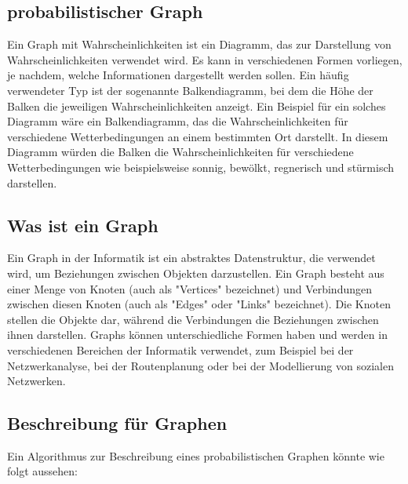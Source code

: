 \subsection{probabilistischer Graph}
Ein Graph mit Wahrscheinlichkeiten ist ein Diagramm, das zur Darstellung von Wahrscheinlichkeiten verwendet wird. Es kann in verschiedenen Formen vorliegen, je nachdem, welche Informationen dargestellt werden sollen. Ein häufig verwendeter Typ ist der sogenannte Balkendiagramm, bei dem die Höhe der Balken die jeweiligen Wahrscheinlichkeiten anzeigt. Ein Beispiel für ein solches Diagramm wäre ein Balkendiagramm, das die Wahrscheinlichkeiten für verschiedene Wetterbedingungen an einem bestimmten Ort darstellt. In diesem Diagramm würden die Balken die Wahrscheinlichkeiten für verschiedene Wetterbedingungen wie beispielsweise sonnig, bewölkt, regnerisch und stürmisch darstellen.



\subsection{Was ist ein Graph}

Ein Graph in der Informatik ist ein abstraktes Datenstruktur, die verwendet wird, um Beziehungen zwischen Objekten darzustellen. Ein Graph besteht aus einer Menge von Knoten (auch als "Vertices" bezeichnet) und Verbindungen zwischen diesen Knoten (auch als "Edges" oder "Links" bezeichnet). Die Knoten stellen die Objekte dar, während die Verbindungen die Beziehungen zwischen ihnen darstellen. Graphs können unterschiedliche Formen haben und werden in verschiedenen Bereichen der Informatik verwendet, zum Beispiel bei der Netzwerkanalyse, bei der Routenplanung oder bei der Modellierung von sozialen Netzwerken.



\subsection{Beschreibung für Graphen}
Ein Algorithmus zur Beschreibung eines probabilistischen Graphen könnte wie folgt aussehen:

